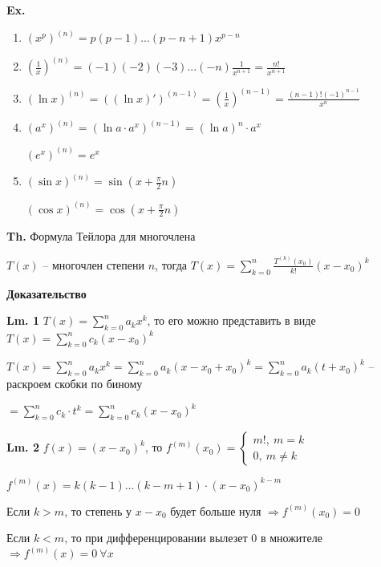 \documentclass[14pt, letter paper]{article}
\begin{document}
\textbf{Ex.} \begin{enumerate}
    \item $(x^p)^{(n)} = p(p - 1)...(p - n + 1)x^{p - n}$
    \item $(\frac{1}{x})^{(n)} = (-1)(-2)(-3)...(-n)\frac{1}{x^{n + 1}} = \frac{n!}{x^{n + 1}}$
    \item $(\ln{x})^{(n)} = ((\ln{x})')^{(n - 1)} = (\frac{1}{x})^{(n - 1)} = \frac{(n - 1)!(-1)^{n - 1}}{x^n}$
    \item $(a^x)^{(n)} = (\ln{a} \cdot a^x)^{(n - 1)} = (\ln{a})^n \cdot a^x$
    
    $(e^x)^{(n)} = e^x$

    \item $(\sin{x})^{(n)} = \sin{(x + \frac{\pi}{2}n)}$
    
    $(\cos{x})^{(n)} = \cos{(x + \frac{\pi}{2}n)}$
\end{enumerate}

\vspace{5mm}

\textbf{Th.} Формула Тейлора для многочлена

$T(x)$ -- многочлен степени $n$, тогда $T(x) = \sum\limits_{k = 0}^n \frac{T^{(k)}(x_0)}{k!}(x - x_0)^k$

\begin{center}
    \textbf{Доказательство}
\end{center}

\textbf{Lm. 1} $T(x) = \sum\limits_{k = 0}^n a_kx^k$, то его можно представить в виде $T(x) = \sum\limits_{k = 0}^n c_k(x - x_0)^k$

$T(x) = \sum\limits_{k = 0}^n a_kx^k = \sum\limits_{k = 0}^n a_k (x - x_0 + x_0)^k = \sum\limits_{k = 0}^n a_k (t + x_0)^k$ -- раскроем скобки по биному

$= \sum\limits_{k = 0}^n c_k \cdot t^k = \sum\limits_{k = 0}^n c_k(x - x_0)^k$

\textbf{Lm. 2} $f(x) = (x - x_0)^k$, то $f^{(m)}(x_0) = \begin{cases}
    m!,\ m = k \\
    0,\ m \neq k
\end{cases}$

$f^{(m)}(x) = k(k - 1)\ldots(k - m + 1) \cdot (x - x_0)^{k - m}$

Если $k > m$, то степень у $x - x_0$ будет больше нуля $\Rightarrow f^{(m)}(x_0) = 0$

Если $k < m$, то при дифференцировании вылезет 0 в множителе $\Rightarrow f^{(m)}(x) = 0\ \forall x$
\end{document}
